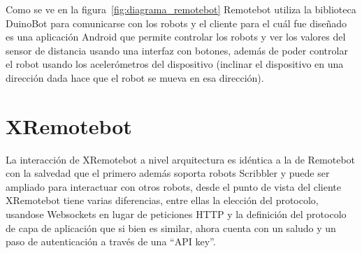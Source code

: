 Como se ve en la figura~\ref{fig:diagrama_remotebot} Remotebot utiliza la
biblioteca DuinoBot para comunicarse con los robots y el cliente para el cuál
fue diseñado es una aplicación Android que permite controlar los robots
y ver los valores del sensor de distancia usando una interfaz con botones,
además de poder controlar el robot usando los acelerómetros del dispositivo
(inclinar el dispositivo en una dirección dada hace que el robot se mueva
en esa dirección).

\section{XRemotebot}\label{ch2:xremotebot}

La interacción de XRemotebot a nivel arquitectura es idéntica a la de Remotebot
con la salvedad que el primero además soporta robots Scribbler y puede ser
ampliado para interactuar con otros robots, desde el punto de vista del cliente
XRemotebot tiene varias diferencias, entre ellas la elección del protocolo,
usandose Websockets en lugar de peticiones HTTP y la definición del protocolo
de capa de aplicación que si bien es similar, ahora cuenta con un saludo y
un paso de autenticación a través de una ``API key''.




